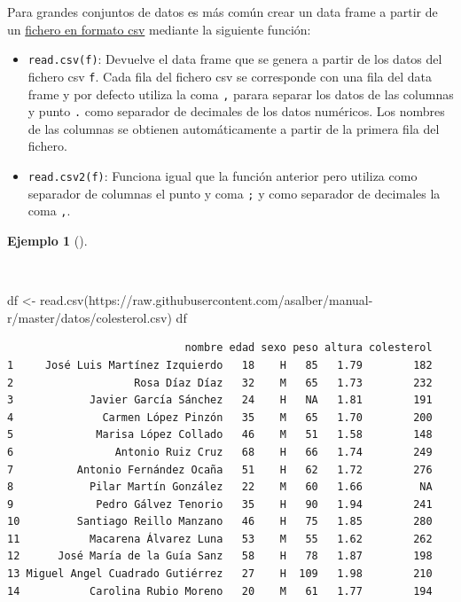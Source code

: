 \documentclass[
  spanish,
  a4paper,
]{scrreport}
\newenvironment{Shaded}{\begin{snugshade}}{\end{snugshade}}
\newcommand{\FunctionTok}[1]{\textcolor[rgb]{0.28,0.35,0.67}{#1}}
\newcommand{\NormalTok}[1]{\textcolor[rgb]{0.00,0.23,0.31}{#1}}
\newcommand{\OtherTok}[1]{\textcolor[rgb]{0.00,0.23,0.31}{#1}}
\newcommand{\StringTok}[1]{\textcolor[rgb]{0.13,0.47,0.30}{#1}}
\providecommand{\tightlist}{%
  \setlength{\itemsep}{0pt}\setlength{\parskip}{0pt}}
\theoremstyle{definition}
\theoremstyle{definition}
\newtheorem{example}{Ejemplo}[chapter]
\theoremstyle{remark}
\begin{document}
Para grandes conjuntos de datos es más común crear un data frame a
partir de un
\href{https://es.wikipedia.org/wiki/Valores_separados_por_comas}{fichero
en formato csv} mediante la siguiente función:

\begin{itemize}
\tightlist
\item
  \texttt{read.csv(f)}: Devuelve el data frame que se genera a partir de
  los datos del fichero csv \texttt{f}. Cada fila del fichero csv se
  corresponde con una fila del data frame y por defecto utiliza la coma
  \texttt{,} parara separar los datos de las columnas y punto \texttt{.}
  como separador de decimales de los datos numéricos. Los nombres de las
  columnas se obtienen automáticamente a partir de la primera fila del
  fichero.
\item
  \texttt{read.csv2(f)}: Funciona igual que la función anterior pero
  utiliza como separador de columnas el punto y coma \texttt{;} y como
  separador de decimales la coma \texttt{,}.
\end{itemize}

\begin{example}[]\protect\hypertarget{exm-creacion-data-frame-csv}{}\label{exm-creacion-data-frame-csv}

~

\begin{Shaded}
\begin{Highlighting}[]
\NormalTok{df }\OtherTok{\textless{}{-}} \FunctionTok{read.csv}\NormalTok{(}\StringTok{\textquotesingle{}https://raw.githubusercontent.com/asalber/manual{-}r/master/datos/colesterol.csv\textquotesingle{}}\NormalTok{)}
\NormalTok{df}
\end{Highlighting}
\end{Shaded}

\begin{verbatim}
                            nombre edad sexo peso altura colesterol
1     José Luis Martínez Izquierdo   18    H   85   1.79        182
2                   Rosa Díaz Díaz   32    M   65   1.73        232
3            Javier García Sánchez   24    H   NA   1.81        191
4              Carmen López Pinzón   35    M   65   1.70        200
5             Marisa López Collado   46    M   51   1.58        148
6                Antonio Ruiz Cruz   68    H   66   1.74        249
7          Antonio Fernández Ocaña   51    H   62   1.72        276
8            Pilar Martín González   22    M   60   1.66         NA
9             Pedro Gálvez Tenorio   35    H   90   1.94        241
10         Santiago Reillo Manzano   46    H   75   1.85        280
11           Macarena Álvarez Luna   53    M   55   1.62        262
12      José María de la Guía Sanz   58    H   78   1.87        198
13 Miguel Angel Cuadrado Gutiérrez   27    H  109   1.98        210
14           Carolina Rubio Moreno   20    M   61   1.77        194
\end{verbatim}

\end{example}
\end{document}
